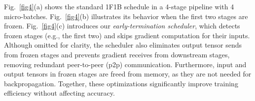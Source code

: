 \documentclass[conference]{IEEEtran}
\begin{document}
Fig.~\ref{fig4}(a) shows the standard 1F1B schedule in a 4-stage pipeline with 4 micro-batches.
Fig.~\ref{fig4}(b) illustrates its behavior when the first two stages are frozen.
Fig.~\ref{fig4}(c) introduces our \textit{early-termination scheduler}, which detects frozen stages (e.g., the first two) and skips gradient computation for their inputs.
Although omitted for clarity, the scheduler also eliminates output tensor sends from frozen stages and prevents gradient receives from downstream stages, removing redundant peer-to-peer (p2p) communication.
Furthermore, input and output tensors in frozen stages are freed from memory, as they are not needed for backpropagation.
Together, these optimizations significantly improve training efficiency without affecting accuracy.
\end{document}
